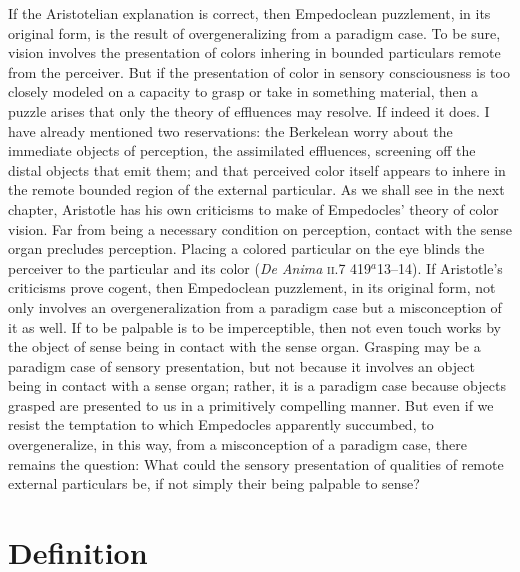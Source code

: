 If the Aristotelian explanation is correct, then Empedoclean puzzlement, in its original form,  is the result of overgeneralizing from a paradigm case. To be sure, vision involves the presentation of colors inhering in bounded particulars remote from the perceiver. But if the presentation of color in sensory consciousness is too closely modeled on a capacity to grasp or take in something material, then a puzzle arises that only the theory of effluences may resolve. If indeed it does. I have already mentioned two reservations: the Berkelean worry about the immediate objects of perception, the assimilated effluences, screening off the distal objects that emit them;  and that perceived color itself appears to inhere in the remote bounded region of the external particular. As we shall see in the next chapter, Aristotle has his own criticisms to make of Empedocles' theory of color vision. Far from being a necessary condition on perception, contact with the sense organ precludes perception. Placing a colored particular on the eye blinds the perceiver to the particular and its color (\emph{De Anima} \textsc{ii}.7 419\( ^{a} \)13--14). If Aristotle's criticisms prove cogent, then Empedoclean puzzlement, in its original form, not only involves an overgeneralization from a paradigm case but a misconception of it as well. If to be palpable is to be imperceptible, then not even touch works by the object of sense being in contact with the sense organ. Grasping may be a paradigm case of sensory presentation, but not because it involves an object being in contact with a sense organ; rather, it is a paradigm case because objects grasped are presented to us in a primitively compelling manner. But even if we resist the temptation to which Empedocles apparently succumbed, to overgeneralize, in this way, from a misconception of a paradigm case, there remains the question: What could the sensory presentation of qualities of remote external particulars be, if not simply their being palpable to sense?


\section{Definition} %
\label{sec:definition}

